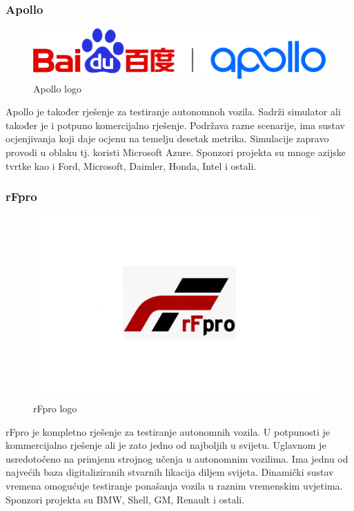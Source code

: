 \subsubsection{Apollo}
\begin{figure}[ht!]
  \centering
  \includegraphics[scale=0.2]{images/apollo_logo.png}
  \caption{Apollo logo\cite{logo:apollo}}
\end{figure}

Apollo je također rješenje za testiranje autonomnoh vozila. Sadrži simulator ali također je i potpuno komercijalno rješenje. Podržava razne scenarije, ima sustav ocjenjivanja koji daje ocjenu na temelju desetak metrika. Simulacije zapravo provodi u oblaku tj. koristi Microsoft Azure. Sponzori projekta su mnoge azijske tvrtke kao i Ford, Microsoft, Daimler, Honda, Intel i ostali.

\subsubsection{rFpro}
\begin{figure}[ht!]
  \centering
  \includegraphics[scale=0.2]{images/rfpro_logo.jpg}
  \caption{rFpro logo\cite{logo:rfpro}}
\end{figure}

rFpro je kompletno rješenje za testiranje autonomnih vozila. U potpunosti je kommercijalno rješenje ali je zato jedno od najboljih u svijetu. Uglavnom je usredotočeno na primjenu strojnog učenja u autonomnim vozilima. Ima jednu od najvećih baza digitaliziranih stvarnih likacija diljem svijeta. Dinamički sustav vremena omogućuje testiranje ponašanja vozila u raznim vremenskim uvjetima. Sponzori projekta su BMW, Shell, GM, Renault i ostali.

